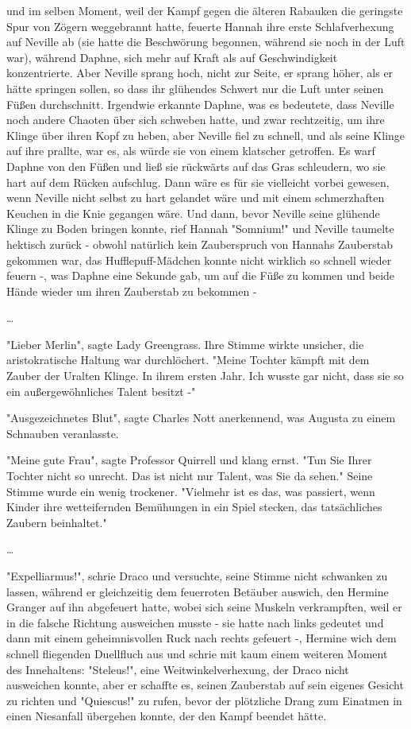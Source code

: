 {und im selben Moment, weil der Kampf gegen die älteren Rabauken die geringste Spur von Zögern weggebrannt hatte, feuerte Hannah ihre erste Schlafverhexung auf Neville ab (sie hatte die Beschwörung begonnen, während sie noch in der Luft war), während Daphne, sich mehr auf Kraft als auf Geschwindigkeit konzentrierte. Aber Neville sprang hoch, nicht zur Seite, er sprang höher, als er hätte springen sollen, so dass ihr glühendes Schwert nur die Luft unter seinen Füßen durchschnitt. Irgendwie erkannte Daphne, was es bedeutete, dass Neville noch andere Chaoten über sich schweben hatte, und zwar rechtzeitig, um ihre Klinge über ihren Kopf zu heben, aber Neville fiel zu schnell, und als seine Klinge auf ihre prallte, war es, als würde sie von einem klatscher getroffen. Es warf Daphne von den Füßen und ließ sie rückwärts auf das Gras schleudern, wo sie hart auf dem Rücken aufschlug. Dann wäre es für sie vielleicht vorbei gewesen, wenn Neville nicht selbst zu hart gelandet wäre und mit einem schmerzhaften Keuchen in die Knie gegangen wäre. Und dann, bevor Neville seine glühende Klinge zu Boden bringen konnte, rief Hannah "Somnium!" und Neville taumelte hektisch zurück - obwohl natürlich kein Zauberspruch von Hannahs Zauberstab gekommen war, das Hufflepuff-Mädchen konnte nicht wirklich so schnell wieder feuern -, was Daphne eine Sekunde gab, um auf die Füße zu kommen und beide Hände wieder um ihren Zauberstab zu bekommen -

…

"Lieber Merlin", sagte Lady Greengrass. Ihre Stimme wirkte unsicher, die aristokratische Haltung war durchlöchert. "Meine Tochter kämpft mit dem Zauber der Uralten Klinge. In ihrem ersten Jahr. Ich wusste gar nicht, dass sie so ein außergewöhnliches Talent besitzt -"

"Ausgezeichnetes Blut", sagte Charles Nott anerkennend, was Augusta zu einem Schnauben veranlasste.

"Meine gute Frau", sagte Professor Quirrell und klang ernst. "Tun Sie Ihrer Tochter nicht so unrecht. Das ist nicht nur Talent, was Sie da sehen." Seine Stimme wurde ein wenig trockener. "Vielmehr ist es das, was passiert, wenn Kinder ihre wetteifernden Bemühungen in ein Spiel stecken, das tatsächliches Zaubern beinhaltet."

…

"Expelliarmus!", schrie Draco und versuchte, seine Stimme nicht schwanken zu lassen, während er gleichzeitig dem feuerroten Betäuber auswich, den Hermine Granger auf ihn abgefeuert hatte, wobei sich seine Muskeln verkrampften, weil er in die falsche Richtung ausweichen musste - sie hatte nach links gedeutet und dann mit einem geheimnisvollen Ruck nach rechts gefeuert -, Hermine wich dem schnell fliegenden Duellfluch aus und schrie mit kaum einem weiteren Moment des Innehaltens: "Steleus!", eine Weitwinkelverhexung, der Draco nicht ausweichen konnte, aber er schaffte es, seinen Zauberstab auf sein eigenes Gesicht zu richten und "Quiescus!" zu rufen, bevor der plötzliche Drang zum Einatmen in einen Niesanfall übergehen konnte, der den Kampf beendet hätte.

}
